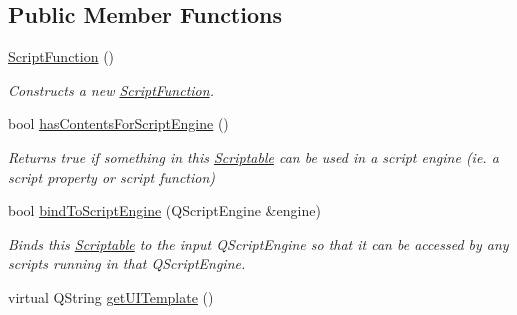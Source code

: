 \subsection*{Public Member Functions}
\begin{DoxyCompactItemize}
\item 
\hyperlink{class_picto_1_1_script_function_a871e00aa80c4d36f8898672c85a4a866}{Script\-Function} ()
\begin{DoxyCompactList}\small\item\em Constructs a new \hyperlink{class_picto_1_1_script_function}{Script\-Function}. \end{DoxyCompactList}\item 
\hypertarget{class_picto_1_1_script_function_ab4c29cd3f0da8087b0b5a953cdc2095a}{bool \hyperlink{class_picto_1_1_script_function_ab4c29cd3f0da8087b0b5a953cdc2095a}{has\-Contents\-For\-Script\-Engine} ()}\label{class_picto_1_1_script_function_ab4c29cd3f0da8087b0b5a953cdc2095a}

\begin{DoxyCompactList}\small\item\em Returns true if something in this \hyperlink{class_picto_1_1_scriptable}{Scriptable} can be used in a script engine (ie. a script property or script function) \end{DoxyCompactList}\item 
\hypertarget{class_picto_1_1_script_function_a057f97a5333812ee5ff269b5cb86f403}{bool \hyperlink{class_picto_1_1_script_function_a057f97a5333812ee5ff269b5cb86f403}{bind\-To\-Script\-Engine} (Q\-Script\-Engine \&engine)}\label{class_picto_1_1_script_function_a057f97a5333812ee5ff269b5cb86f403}

\begin{DoxyCompactList}\small\item\em Binds this \hyperlink{class_picto_1_1_scriptable}{Scriptable} to the input Q\-Script\-Engine so that it can be accessed by any scripts running in that Q\-Script\-Engine. \end{DoxyCompactList}\item 
\hypertarget{class_picto_1_1_script_function_a0af7a31441647632ba9d33c746e1c068}{virtual Q\-String \hyperlink{class_picto_1_1_script_function_a0af7a31441647632ba9d33c746e1c068}{get\-U\-I\-Template} ()}\label{class_picto_1_1_script_function_a0af7a31441647632ba9d33c746e1c068}


\end{DoxyCompactItemize}
